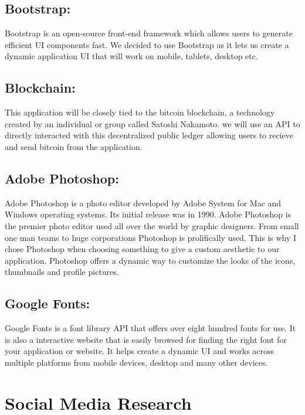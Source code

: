 \subsection{Bootstrap:}
Bootstrap is an open-source front-end framework which allows users to generate efficient UI components fast. We decided to use Bootstrap as it lets us create a dynamic application UI that will work on mobile, tablets, desktop etc.

\subsection{Blockchain:}
This application will be closely tied to the bitcoin blockchain, a technology created by an individual or group called Satoshi Nakamoto. we will use an API to directly interacted with this decentralized public ledger allowing users to recieve and send bitcoin from the application.

\subsection{Adobe Photoshop:}
Adobe Photoshop is a photo editor developed by Adobe System for Mac and Windows operating systems. Its initial release was in 1990. Adobe Photoshop is the premier photo editor used all over the world by graphic designers. From small one man teams to huge corporations Photoshop is prolifically used. This is why I chose Photoshop when choosing something to give a custom aesthetic to our application. Photoshop offers a dynamic way to customize the looks of the icons, thumbnails and profile pictures. 

\subsection{Google Fonts:}
Google Fonts is a font library API that offers over eight hundred fonts for use. It is also a interactive website that is easily browsed for finding the right font for your application or website. It helps create a dynamic UI and works across multiple platforms from mobile devices, desktop and many other devices.


\section{Social Media Research}

